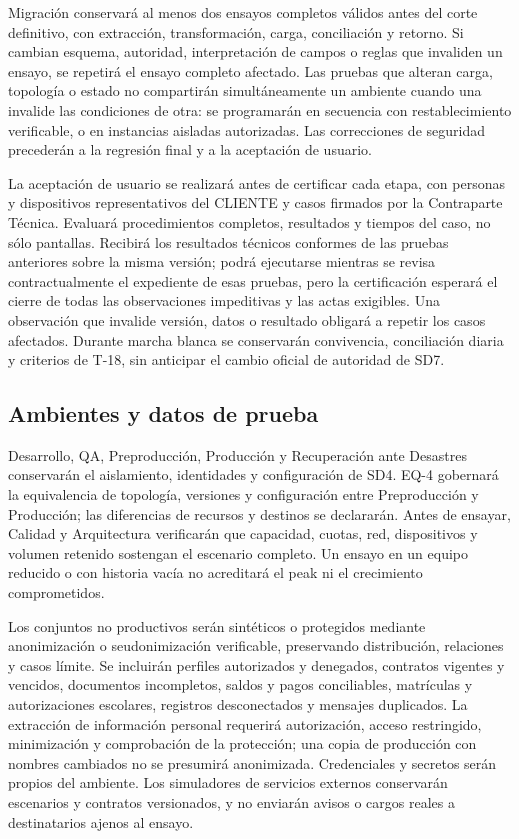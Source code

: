Migración conservará al menos dos ensayos completos válidos antes del corte definitivo, con extracción, transformación, carga, conciliación y retorno. Si cambian esquema, autoridad, interpretación de campos o reglas que invaliden un ensayo, se repetirá el ensayo completo afectado. Las pruebas que alteran carga, topología o estado no compartirán simultáneamente un ambiente cuando una invalide las condiciones de otra: se programarán en secuencia con restablecimiento verificable, o en instancias aisladas autorizadas. Las correcciones de seguridad precederán a la regresión final y a la aceptación de usuario. \parencites[20.1, pp.~34--35]{sd9-bt}[Ensayos completos y recepción previa a los cortes]{sd9-t14}

La aceptación de usuario se realizará antes de certificar cada etapa, con personas y dispositivos representativos del CLIENTE y casos firmados por la Contraparte Técnica. Evaluará procedimientos completos, resultados y tiempos del caso, no sólo pantallas. Recibirá los resultados técnicos conformes de las pruebas anteriores sobre la misma versión; podrá ejecutarse mientras se revisa contractualmente el expediente de esas pruebas, pero la certificación esperará el cierre de todas las observaciones impeditivas y las actas exigibles. Una observación que invalide versión, datos o resultado obligará a repetir los casos afectados. Durante marcha blanca se conservarán convivencia, conciliación diaria y criterios de T-18, sin anticipar el cambio oficial de autoridad de SD7. \parencite[20.1 y RT-20.03/04/08, pp.~34--35]{sd9-bt}

\subsection{Ambientes y datos de prueba}
Desarrollo, QA, Preproducción, Producción y Recuperación ante Desastres conservarán el aislamiento, identidades y configuración de SD4. EQ-4 gobernará la equivalencia de topología, versiones y configuración entre Preproducción y Producción; las diferencias de recursos y destinos se declararán. Antes de ensayar, Calidad y Arquitectura verificarán que capacidad, cuotas, red, dispositivos y volumen retenido sostengan el escenario completo. Un ensayo en un equipo reducido o con historia vacía no acreditará el peak ni el crecimiento comprometidos. \parencite[sec.~6.2, DevSecOps, ambientes y cadena de suministro]{sd9-sd6}

Los conjuntos no productivos serán sintéticos o protegidos mediante anonimización o seudonimización verificable, preservando distribución, relaciones y casos límite. Se incluirán perfiles autorizados y denegados, contratos vigentes y vencidos, documentos incompletos, saldos y pagos conciliables, matrículas y autorizaciones escolares, registros desconectados y mensajes duplicados. La extracción de información personal requerirá autorización, acceso restringido, minimización y comprobación de la protección; una copia de producción con nombres cambiados no se presumirá anonimizada. Credenciales y secretos serán propios del ambiente. Los simuladores de servicios externos conservarán escenarios y contratos versionados, y no enviarán avisos o cargos reales a destinatarios ajenos al ensayo. \parencite[RT-11.25, p.~24]{sd9-bt}

